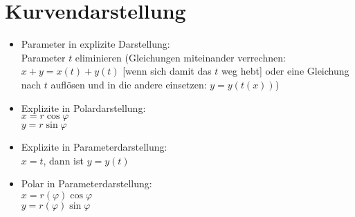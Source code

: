 \documentclass{scrreprt}
\begin{document}
\section{Kurvendarstellung}
\begin{itemize}
\item Parameter in explizite Darstellung:\\
Parameter $t$ eliminieren (Gleichungen miteinander verrechnen: $x+y=x(t)+y(t)$ [wenn sich damit das $t$ weg hebt] oder eine Gleichung nach $t$ auflösen und in die andere einsetzen: $y=y(t(x))$)
\item Explizite in Polardarstellung:\\
$x=r\cos\varphi$\\
$y=r\sin \varphi$
\item Explizite in Parameterdarstellung:\\
$x=t$, dann ist $y=y(t)$
\item Polar in Parameterdarstellung:\\
$x=r(\varphi)\cos\varphi$\\
$y=r(\varphi) \sin \varphi$
\end{itemize}
\end{document}
